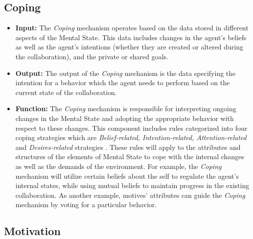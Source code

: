 \documentclass[12pt]{report}
\begin{document}
\subsection{Coping}

\begin{itemize}
  \item \textbf{Input:} The \textit{Coping} mechanism operates based on the data
  stored in different aspects of the Mental State. This data includes changes
  in the agent's beliefs as well as the agent's intentions (whether they are
  created or altered during the collaboration), and the private or shared goals.
  
  \item \textbf{Output:} The output of the \textit{Coping} mechanism is the data
  specifying the intention for a behavior which the agent needs to perform based
  on the current state of the collaboration.
  
  \item \textbf{Function:} The \textit{Coping} mechanism is responsible for
  interpreting ongoing changes in the Mental State and adopting the appropriate
  behavior with respect to these changes. This component includes rules
  categorized into four coping strategies which are \textit{Belief-related,
  Intention-related, Attention-related} and \textit{Desires-related} strategies
  \cite{marsella:ema-process-model}. These rules will apply to the attributes
  and structures of the elements of Mental State to cope with the internal
  changes as well as the demands of the environment. For example, the
  \textit{Coping} mechanism will utilize certain beliefs about the self to
  regulate the agent's internal states, while using mutual beliefs to maintain
  progress in the existing collaboration. As another example, motives'
  attributes can guide the \textit{Coping} mechanism by voting for a particular
  behavior.
\end{itemize}

\subsection{Motivation}
\label{section-motivation-mechanism}
\end{document}
